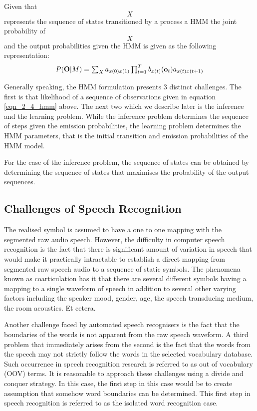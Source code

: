 Given that $$X$$ represents the sequence of states transitioned by a process a HMM the joint probability of $$X$$ and the output probabilities given the HMM is given as the following representation:
\begin{equation}$$P(\mathbf{O}|M)=\sum_Xa_{x(0)x(1)}\prod_{t=1}^Tb_{x(t)}(\mathbf{o}_t)a_{x(t)x(t+1)}$$
\label{eqn_2_4_hmm}
\end{equation}

Generally speaking, the HMM formulation presents 3 distinct challenges.  The first is that likelihood of a sequence of observations given in equation \ref{eqn_2_4_hmm} above.  The next two which we describe later is the inference and the learning problem.  While the inference problem determines the sequence of steps given the emission probabilities, the learning problem determines the HMM parameters, that is the initial transition and emission probabilities of the HMM model.

For the case of the inference problem, the sequence of states can be obtained by determining the sequence of states that maximises the probability of the output sequences.

\subsection{Challenges of Speech Recognition}
The realised symbol is assumed to have a one to one mapping with the segmented raw audio speech. However, the difficulty in computer speech recognition is the fact that there is significant amount of variation in speech that would make it practically intractable to establish a direct mapping from segmented raw speech audio to a sequence of static symbols. The phenomena known as coarticulation has it that there are several different symbols having a mapping to a single waveform of speech in addition to several other varying factors including the speaker mood, gender, age, the speech transducing medium, the room acoustics. Et cetera.

Another challenge faced by automated speech recognisers is the fact that the boundaries of the words is not apparent from the raw speech waveform. A third problem that immediately arises from the second is the fact that the words from the speech may not strictly follow the words in the selected vocabulary database.  Such occurrence in speech recognition research is referred to as out of vocabulary (OOV) terms.  It is reasonable to approach these challenges using a divide and conquer strategy.  In this case, the first step in this case would be to create assumption that somehow word boundaries can be determined.  This first step in speech recognition is referred to as the isolated word recognition case.

